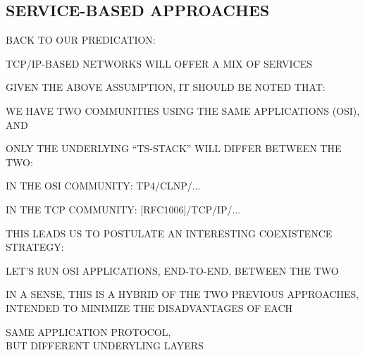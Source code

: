 \begin{bwslide}
\part	{SERVICE-BASED APPROACHES}\bf

\begin{nrtc}
\item	BACK TO OUR PREDICATION:
    \begin{nrtc}
    \item	TCP/IP-BASED NETWORKS WILL OFFER A MIX OF SERVICES
    \end{nrtc}
\end{nrtc}
\end{bwslide}


\begin{bwslide}

\begin{nrtc}
\item	GIVEN THE ABOVE ASSUMPTION, IT SHOULD BE NOTED THAT:
    \begin{nrtc}
    \item	WE HAVE TWO COMMUNITIES USING THE SAME APPLICATIONS
		(OSI), AND

    \item	ONLY THE UNDERLYING ``TS-STACK'' WILL DIFFER BETWEEN THE TWO:
	\begin{nrtc}
	\item	IN THE OSI COMMUNITY: TP4/CLNP/$\ldots$

	\item	IN THE TCP COMMUNITY: [RFC1006]/TCP/IP/$\ldots$
	\end{nrtc}
    \end{nrtc}

\item	THIS LEADS US TO POSTULATE AN INTERESTING COEXISTENCE
	STRATEGY:
    \begin{nrtc}
    \item	LET'S RUN OSI APPLICATIONS, END-TO-END, BETWEEN THE TWO
    \end{nrtc}

\item	IN A SENSE, THIS IS A HYBRID OF THE TWO PREVIOUS APPROACHES,
	INTENDED TO MINIMIZE THE DISADVANTAGES OF EACH
    \begin{nrtc}
	\item	SAME APPLICATION PROTOCOL,\\
		BUT DIFFERENT UNDERYLING LAYERS
    \end{nrtc}
\end{nrtc}
\end{bwslide}


